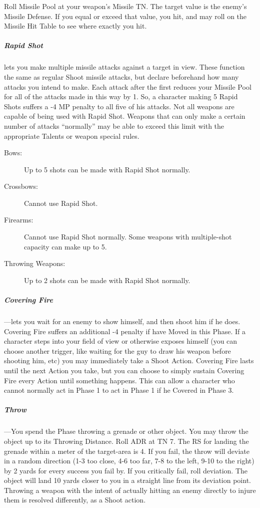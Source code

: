 \documentclass[oneside,11pt,english]{book}
\begin{document}
Roll Missile Pool at your weapon’s Missile TN. The target value is the enemy’s
Missile Defense. If you equal or exceed that value, you hit, and may roll on the
Missile Hit Table to see where exactly you hit. 
\subparagraph{Rapid Shot} lets you make multiple missile attacks against a
target in view. These function the same as regular Shoot missile attacks, but
declare beforehand how many attacks you intend to make. Each attack after the
first reduces your Missile Pool for all of the attacks made in this way by 1.
So, a character making 5 Rapid Shots suffers a -4 MP penalty to all five of his
attacks. Not all weapons are capable of being used with Rapid Shot. Weapons that
can only make a certain number of attacks “normally” may be able to exceed this
limit with the appropriate Talents or weapon special rules. 
\begin{description}
\item [Bows:] Up to 5 shots can be made with Rapid Shot normally.
\item	[Crossbows:] Cannot use Rapid Shot.
\item	[Firearms:] Cannot use Rapid Shot normally. Some weapons with
  multiple-shot capacity can make up to 5. 
\item [Throwing Weapons:] Up to 2 shots can be made with Rapid Shot normally.
\end{description}

\subparagraph{\label{par:Covering Fire} Covering Fire}
---\quad lets you wait for an enemy to show himself, and then shoot him if he
does. Covering Fire suffers an additional -4 penalty if have Moved in this
Phase. If a character steps into your field of view or otherwise exposes himself
(you can choose another trigger, like waiting for the guy to draw his weapon
before shooting him, etc) you may immediately take a Shoot Action. Covering Fire
lasts until the next Action you take, but you can choose to simply sustain
Covering Fire every Action until something happens. This can allow a character
who cannot normally act in Phase 1 to act in Phase 1 if he Covered in Phase 3.

\subparagraph{Throw}
---\quad You spend the Phase throwing a grenade or other object. You may throw
the object up to its Throwing Distance. Roll ADR at TN 7. The RS for landing the
grenade within a meter of the target-area is 4. If you fail, the throw will
deviate in a random direction (1-3 too close, 4-6 too far, 7-8 to the left, 9-10
to the right) by 2 yards for every success you fail by. If you critically fail,
roll deviation. The object will land 10 yards closer to you in a straight line
from its deviation point. Throwing a weapon with the intent of actually hitting
an enemy directly to injure them is resolved differently, as a Shoot action.
\end{document}
